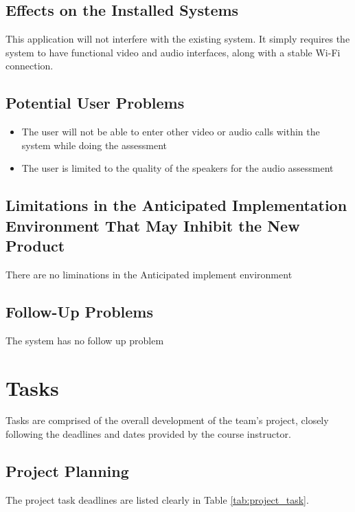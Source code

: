 \documentclass[12pt]{article}
\begin{document}
\subsection{Effects on the Installed Systems}
\hspace{2em}This application will not interfere with the existing system. It simply requires the system to have functional video and audio interfaces, along with a stable Wi-Fi connection.
\subsection{Potential User Problems}
\begin{itemize}
  \item The user will not be able to enter other video or audio calls within the system while doing the assessment
  \item The user is limited to the quality of the speakers for the audio assessment
\end{itemize}
\subsection{Limitations in the Anticipated Implementation Environment That May
Inhibit the New Product}
There are no liminations in the Anticipated implement environment
\subsection{Follow-Up Problems}
The system has no follow up problem

\newpage

\section{Tasks}
\hspace{2em}Tasks are comprised of the overall development of the team's project, closely following the deadlines and dates provided by the course instructor.
\subsection{Project Planning}

\hspace{2em} The project task deadlines are listed clearly in Table \ref{tab:project_task}.
\end{document}
